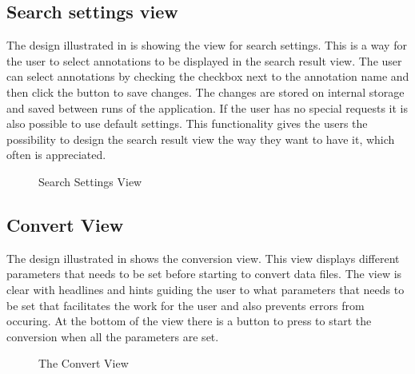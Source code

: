 \subsection{Search settings view}
The design illustrated in  is showing the view for search settings. 
This is a way for the user to select annotations to be displayed in the search result view.
The user can select annotations by checking the checkbox next to the annotation name and then click the button to save changes.
The changes are stored on internal storage and saved between runs of the application.
If the user has no special requests it is also possible to use default settings. 
This functionality gives the users the possibility to design the search result view the way they want to have it, which often is appreciated. 

\begin{figure}[ht]
\caption{Search Settings View}
\label{fig:and_search_settings}
\end{figure}
\FloatBarrier

\subsection{Convert View}
The design illustrated in  shows the conversion view. 
This view displays different parameters that needs to be set before starting to convert data files. 
The view is clear with headlines and hints guiding the user to what parameters that needs to be set that facilitates the work for the user and also prevents errors from occuring. 
At the bottom of the view there is a button to press to start the conversion when all the parameters are set. 

\begin{figure}[h]
\caption{The Convert View}
\label{fig:and_convert_man} 
\end{figure}
\FloatBarrier
